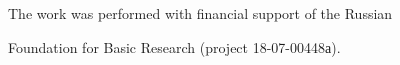 




 





   












   \Ack


   \noindent


   The work was performed with financial support of the Russian 


   Foundation for Basic Research (project 18-07-00448а).


   


      


  


\renewcommand{\bibname}{\protect\rmfamily References}







